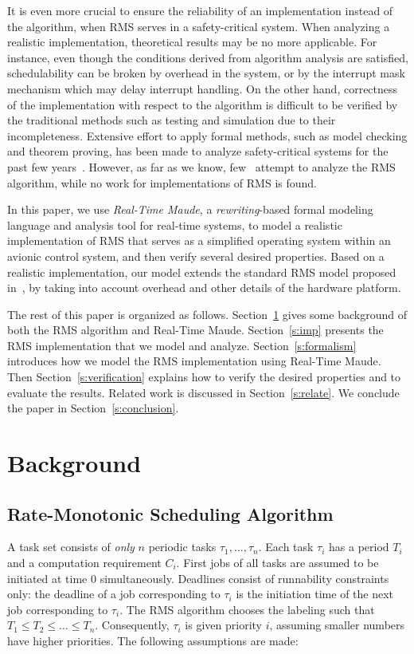 \documentclass[12pt,onecolumn]{IEEEtranTIE}
\begin{document}
It is even more crucial to ensure the reliability of an implementation
instead of the algorithm, when RMS serves in a safety-critical
system. When analyzing a realistic implementation, theoretical results
may be no more applicable. For instance, even though the conditions
derived from algorithm analysis are satisfied, schedulability can be
broken by overhead in the system, or by the interrupt mask mechanism
which may delay interrupt handling. On the other hand, correctness of
the implementation with respect to the algorithm is difficult to be
verified by the traditional methods such as testing and simulation due
to their incompleteness. Extensive effort to apply formal methods,
such as model checking and theorem proving, has been made to analyze
safety-critical systems for the past few
years~\cite{DBLP:journals/tie/JiangZLDSGS15,DBLP:journals/iandc/MeseguerR13,DBLP:journals/cacm/Leroy09,DBLP:conf/sosp/KleinEHACDEEKNSTW09}. However,
as far as we know, few~\cite{TianD2011,DBLP:conf/iceccs/CuiDT14}
attempt to analyze the RMS algorithm, while no work for
implementations of RMS is found.

In this paper, we use \emph{Real-Time Maude}, a \emph{rewriting}-based
formal modeling language and analysis tool for real-time systems, to
model a realistic implementation of RMS that serves as a simplified
operating system within an avionic control system, and then verify
several desired properties. Based on a realistic implementation, our
model extends the standard RMS model proposed
in~\cite{DBLP:journals/jacm/LiuL73}, by taking into account overhead
and other details of the hardware platform.

The rest of this paper is organized as
follows. Section~\ref{s:background} gives some background of both the
RMS algorithm and Real-Time Maude.  Section~\ref{s:imp} presents the
RMS implementation that we model and analyze.
Section~\ref{s:formalism} introduces how we model the RMS
implementation using Real-Time Maude. Then
Section~\ref{s:verification} explains how to verify the desired
properties and to evaluate the results. Related work is discussed in
Section~\ref{s:relate}. We conclude the paper in
Section~\ref{s:conclusion}.


\section{Background}
\label{s:background}

\subsection{Rate-Monotonic Scheduling Algorithm}
\label{ss:rms}
A task set consists of \emph{only} $n$ periodic tasks
$\tau_1,\ldots,\tau_n$. Each task $\tau_i$ has a period $T_i$ and a
computation requirement $C_i$. First jobs of all tasks are assumed to
be initiated at time $0$ simultaneously.  Deadlines consist of
runnability constraints only: the deadline of a job corresponding to
$\tau_i$ is the initiation time of the next job corresponding to
$\tau_i$.  The RMS algorithm chooses the labeling such that $T_1\le
T_2\le \ldots \le T_n$. Consequently, $\tau_i$ is given priority $i$,
assuming smaller numbers have higher priorities. The following
assumptions are made:
\end{document}
